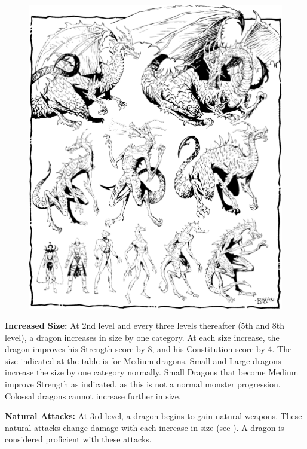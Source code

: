 {\begin{figure}[b!]
\centering
\includegraphics[width=\textwidth]{images/dragon-3.png}
\WOTC
\end{figure}

\textbf{Increased Size:} At 2nd level and every three levels thereafter (5th and 8th level), a dragon increases in size by one category. At each size increase, the dragon improves his Strength score by 8, and his Constitution score by 4. The size indicated at the table is for Medium dragons. Small and Large dragons increase the size by one category normally. Small Dragons that become Medium improve Strength as indicated, as this is not a normal monster progression. Colossal dragons cannot increase further in size.

\textbf{Natural Attacks:} At 3rd level, a dragon begins to gain natural weapons. These natural attacks change damage with each increase in size (see ). A dragon is considered proficient with these attacks.

}
